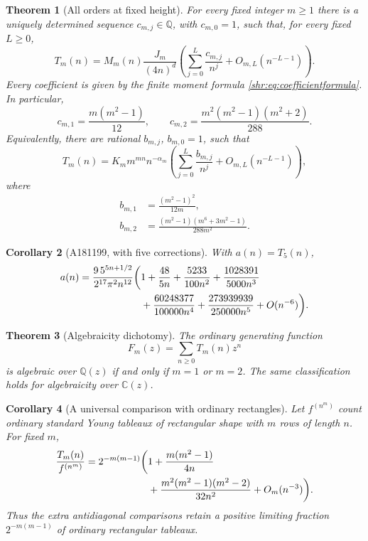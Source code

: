\documentclass[11pt,letterpaper]{article}
\numberwithin{equation}{section}
\newtheorem{theorem}{Theorem}[section]
\newtheorem{corollary}[theorem]{Corollary}
\theoremstyle{definition}
\newcommand{\Q}{\mathbb Q}
\newcommand{\1}{\mathbf 1}
\begin{document}
\begin{theorem}[All orders at fixed height]\label{shr:thm:main}
For every fixed integer $m\ge1$ there is a uniquely determined sequence
$c_{m,j}\in\Q$, with $c_{m,0}=1$, such that, for every fixed $L\ge0$,
\begin{equation}
 T_m(n)=M_m(n)\frac{J_m}{(4n)^d}
 \left(\sum_{j=0}^{L}\frac{c_{m,j}}{n^j}
       +O_{m,L}(n^{-L-1})\right).
 \label{shr:eq:mainM}
\end{equation}
Every coefficient is given by the finite moment formula
\eqref{shr:eq:coefficientformula}. In particular,
\begin{equation}
 c_{m,1}=\frac{m(m^2-1)}{12},\qquad
 c_{m,2}=\frac{m^2(m^2-1)(m^2+2)}{288}.
 \label{shr:eq:c12}
\end{equation}
Equivalently, there are rational $b_{m,j}$, $b_{m,0}=1$, such that
\begin{equation}
 T_m(n)=K_m m^{mn}n^{-\alpha_m}
 \left(\sum_{j=0}^{L}\frac{b_{m,j}}{n^j}
       +O_{m,L}(n^{-L-1})\right),
 \label{shr:eq:mainK}
\end{equation}
where
\begin{align}
 b_{m,1}&=\frac{(m^2-1)^2}{12m},\\
 b_{m,2}&=\frac{(m^2-1)(m^6+3m^2-1)}{288m^2}.
 \label{shr:eq:b12}
\end{align}
\end{theorem}

\begin{corollary}[A181199, with five corrections]\label{shr:cor:A181199}
With $a(n)=T_5(n)$,
\begin{align}
 a(n)=\frac{9\,5^{5n+1/2}}{2^{17}\pi^2n^{12}}
 \bigg(&1+\frac{48}{5n}+\frac{5233}{100n^2}
       +\frac{1028391}{5000n^3}\notag\\
       &+\frac{60248377}{100000n^4}
       +\frac{273939939}{250000n^5}+O(n^{-6})\bigg).
 \label{shr:eq:A181199exp}
\end{align}
\end{corollary}

\begin{theorem}[Algebraicity dichotomy]\label{shr:thm:algebraic}
The ordinary generating function
\[
 F_m(z)=\sum_{n\ge0}T_m(n)z^n
\]
is algebraic over $\Q(z)$ if and only if $m=1$ or $m=2$.
The same classification holds for algebraicity over $\mathbb C(z)$.
\end{theorem}

\begin{corollary}[A universal comparison with ordinary rectangles]
Let $f^{(n^m)}$ count ordinary standard Young tableaux of rectangular shape
with $m$ rows of length $n$. For fixed $m$,
\begin{align}
\frac{T_m(n)}{f^{(n^m)}}=2^{-m(m-1)}\bigg(&1+
 \frac{m(m^2-1)}{4n}\notag\\
 &+\frac{m^2(m^2-1)(m^2-2)}{32n^2}+O_m(n^{-3})\bigg).
 \label{shr:eq:rectangle-ratio}
\end{align}
Thus the extra antidiagonal comparisons retain a positive limiting fraction
$2^{-m(m-1)}$ of ordinary rectangular tableaux.
\end{corollary}
\end{document}
